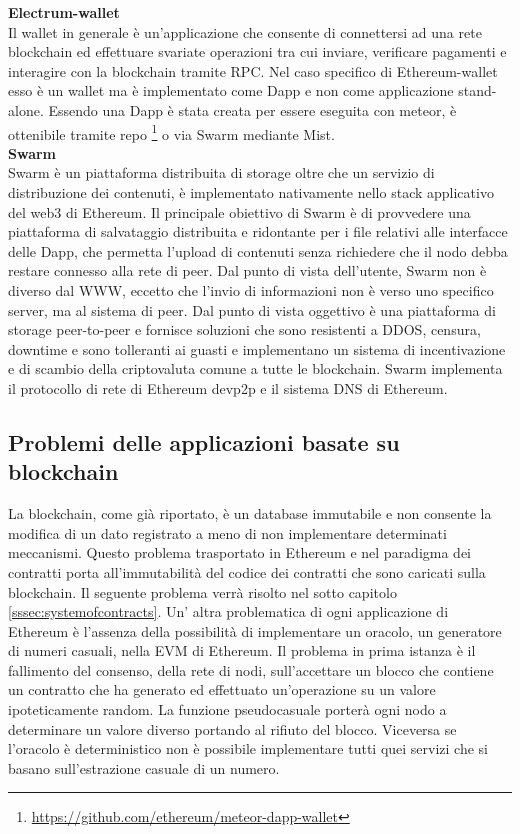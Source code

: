 	\textbf{Electrum-wallet}\\
	
	Il wallet in generale è un'applicazione che consente di connettersi ad una rete blockchain ed effettuare svariate operazioni tra cui inviare, verificare pagamenti e interagire con la blockchain tramite RPC.
	Nel caso specifico di Ethereum-wallet esso è un wallet ma è implementato come Dapp e non come applicazione stand-alone. Essendo una Dapp è stata creata per essere eseguita con meteor, è ottenibile tramite repo \footnote{\url{https://github.com/ethereum/meteor-dapp-wallet}} o via Swarm mediante Mist.\\
	
	\textbf{Swarm}\\
	
	Swarm è un piattaforma distribuita di storage oltre che un servizio di distribuzione dei contenuti, è implementato nativamente nello stack applicativo del web3 di Ethereum. Il principale obiettivo di Swarm è di provvedere una piattaforma di salvataggio distribuita e ridontante per i file relativi alle interfacce delle Dapp, che permetta l'upload di contenuti senza richiedere che il nodo debba restare connesso alla rete di peer.
	Dal punto di vista dell'utente, Swarm non è diverso dal WWW, eccetto che l'invio di informazioni non è verso uno specifico server, ma al sistema di peer. Dal punto di vista oggettivo è una piattaforma di storage peer-to-peer e fornisce soluzioni che sono resistenti a DDOS, censura, downtime e sono tolleranti ai guasti e implementano un sistema di incentivazione e di scambio della criptovaluta comune a tutte le blockchain. Swarm implementa il protocollo di rete di Ethereum devp2p e il sistema DNS di Ethereum.\\
		

\subsection{Problemi delle applicazioni basate su blockchain}\label{ssec:prolemibasatisublockchain}

La blockchain, come già riportato, è un database immutabile e non consente la modifica di un dato registrato a meno di non implementare determinati meccanismi. Questo problema trasportato in Ethereum e nel paradigma dei contratti porta all'immutabilità del codice dei contratti che sono caricati sulla blockchain. Il seguente problema verrà risolto nel sotto capitolo \ref{sssec:systemofcontracts}. Un' altra problematica di ogni applicazione di Ethereum è l'assenza della possibilità di implementare un oracolo, un generatore di numeri casuali, nella EVM di Ethereum. 
Il problema in prima istanza è il fallimento del consenso, della rete di nodi, sull'accettare un blocco che contiene un contratto che ha generato ed effettuato un'operazione su un valore ipoteticamente random. La funzione pseudocasuale porterà ogni nodo a determinare un valore diverso portando al rifiuto del blocco.
Viceversa se l'oracolo è deterministico non è possibile implementare tutti quei servizi che si basano sull'estrazione casuale di un numero. 


